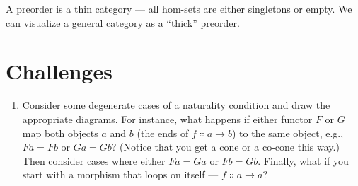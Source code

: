 A preorder is a thin category --- all hom-sets are either singletons or
empty. We can visualize a general category as a ``thick'' preorder.

\section{Challenges}

\begin{enumerate}
\tightlist
\item
  Consider some degenerate cases of a naturality condition and draw the
  appropriate diagrams. For instance, what happens if either functor
  $F$ or $G$ map both objects $a$ and $b$
  (the ends of $f \Colon a \to b$) to the same
  object, e.g., $F a = F b$ or $G a = G b$?
  (Notice that you get a cone or a co-cone this way.) Then consider
  cases where either $F a = G a$ or $F b = G b$.
  Finally, what if you start with a morphism that loops on itself ---
  $f \Colon a \to a$?
\end{enumerate}